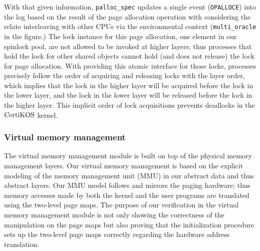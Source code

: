 With that given information, \lstinline$palloc_spec$ updates a single event (\lstinline$OPALLOCE$) into the log based on the result of the page allocation operation with considering the relate interleaving with other CPUs via the environmental context (\lstinline$multi_oracle$ in the figure.)
The lock instance for this page allocation, one element in our spinlock pool, are not allowed to be invoked at higher layers;
thus processes that hold the lock for other shared objects 
cannot hold (and does not release) the lock for page allocation.
With providing this atomic interface for those locks,
processes precisely follow the order of acquiring and releasing locks with the layer order, which implies that 
the lock in the higher layer will be acquired before the lock in the lower layer,
and the lock in the lower layer will be released before the lock in the higher layer.
This implicit order of lock acquisitions prevents deadlocks in the $\mathrm{CertiKOS}$ kernel.


\subsubsection{Virtual memory management}
The virtual memory management module is built on top of the physical memory management layers. 
Our virtual memory management is
based on the explicit modeling of the memory management unit (MMU) in our abstract data and thus abstract layers. 
Our MMU model follows and mirrors the paging hardware; thus memory accesses made by both the kernel and the user programs are translated using the two-level page maps. 
The purpose of our verification in the virtual memory management module is
not only showing the correctness of the manipulation on the page maps but also proving 
that the initialization procedure sets up the two-level page maps correctly regarding the hardware address translation.

